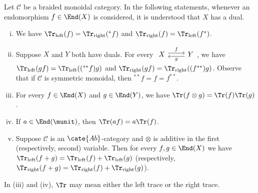 \begin{proposition}\label{prop:trace}
	Let $\mathcal{C}$ be a braided monoidal category. In the following
	statements, whenever an endomorphism $f\in\End(X)$ is considered, it is
	understood that $X$ has a dual.
	\begin{enumerate}[(i)]
		\item We have
		$\Tr_{\text{left}}(f)=\Tr_{\text{right}}({}^*f)$ and
		$\Tr_{\text{right}}(f)=\Tr_{\text{left}}(f^*)$.
		\item Suppose $X$ and $Y$ both have duals. For every
		$\begin{tikzcd} X \arrow[shift left, r, "f"] & Y \arrow[shift left, l, "g"] \end{tikzcd}$,
		we have
		$\Tr_{\text{left}}(gf)=\Tr_{\text{left}}(({}^{**}f)g)$ and
		$\Tr_{\text{right}}(gf)=\Tr_{\text{right}}((f^{**})g)$.
		Observe that if $\mathcal{C}$ is symmetric monoidal, then
		${}^{**}f=f=f^{**}$.
		\item For every $f\in\End(X)$ and $g\in\End(Y)$, we have
		$\Tr(f\otimes g)=\Tr(f)\Tr(g)$.
		\item If $a\in\End(\munit)$, then
		$\Tr(af)=a\Tr(f)$.
		\item Suppose $\mathcal{C}$ is an $\cate{Ab}$-category and $\otimes$
		is additive in the first (respectively, second) variable. Then for every
		$f,g\in\End(X)$ we have
		$\Tr_{\text{left}}(f+g)=\Tr_{\text{left}}(f)+\Tr_{\text{left}}(g)$
		(respectively,
		$\Tr_{\text{right}}(f+g)=\Tr_{\text{right}}(f)+\Tr_{\text{right}}(g)$).
	\end{enumerate}
	In (iii) and (iv), $\Tr$ may mean either the left trace or the right trace.
\end{proposition}
